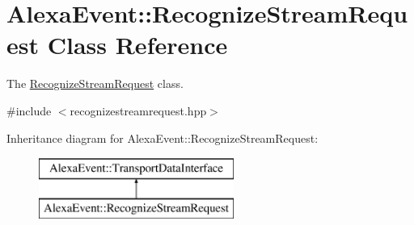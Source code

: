 \hypertarget{classAlexaEvent_1_1RecognizeStreamRequest}{}\section{Alexa\+Event\+:\+:Recognize\+Stream\+Request Class Reference}
\label{classAlexaEvent_1_1RecognizeStreamRequest}


The \hyperlink{classAlexaEvent_1_1RecognizeStreamRequest}{Recognize\+Stream\+Request} class.  




{\ttfamily \#include $<$recognizestreamrequest.\+hpp$>$}

Inheritance diagram for Alexa\+Event\+:\+:Recognize\+Stream\+Request\+:\begin{figure}[H]
\begin{center}
\leavevmode
\includegraphics[height=2.000000cm]{d1/d02/classAlexaEvent_1_1RecognizeStreamRequest}
\end{center}
\end{figure}
